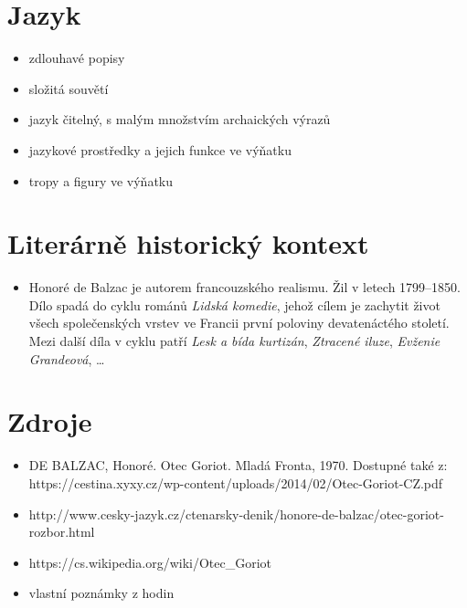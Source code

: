 \documentclass[10pt,a4paper]{article}
\begin{document}
\section*{Jazyk}
\begin{itemize}
\item zdlouhavé popisy
\item složitá souvětí
\item jazyk čitelný, s malým množstvím archaických výrazů
\item jazykové prostředky a jejich funkce ve výňatku
\item tropy a figury ve výňatku
\end{itemize}
\section*{Literárně historický kontext}
\begin{itemize}
\item Honoré de Balzac je autorem francouzského realismu. Žil v letech 1799--1850. Dílo spadá do cyklu románů \textit{Lidská komedie}, jehož cílem je zachytit život všech společenských vrstev ve Francii první poloviny devatenáctého století. Mezi další díla v cyklu patří \textit{Lesk a bída kurtizán}, \textit{Ztracené iluze}, \textit{Evženie Grandeová}, \ldots
\end{itemize}
\section*{Zdroje}
\begin{itemize}
\item DE BALZAC, Honoré. Otec Goriot. Mladá Fronta, 1970. Dostupné také z: https://cestina.xyxy.cz/wp-content/uploads/2014/02/Otec-Goriot-CZ.pdf
\item http://www.cesky-jazyk.cz/ctenarsky-denik/honore-de-balzac/otec-goriot-rozbor.html
\item https://cs.wikipedia.org/wiki/Otec\_Goriot
\item vlastní poznámky z hodin
\end{itemize}
\end{document}
